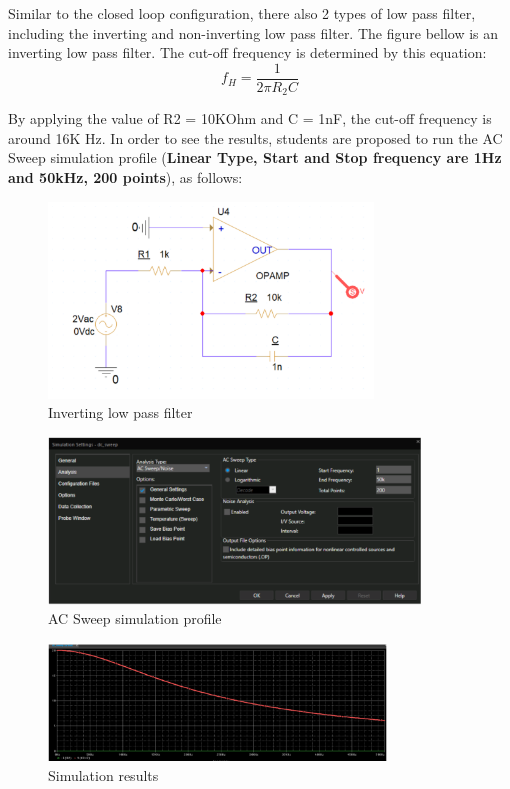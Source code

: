 Similar to the closed loop configuration, there also 2 types of low pass filter, including the
inverting and non-inverting low pass filter. The figure bellow is an inverting low pass filter.
The cut-off frequency is determined by this equation:
\[f_H = \dfrac{1}{2\pi R_2 C}\]

By applying the value of R2 = 10KOhm and C = 1nF, the cut-off frequency is around
16K Hz. In order to see the results, students are proposed to run the AC Sweep simulation profile (\textbf{Linear Type, Start and Stop frequency are 1Hz and 50kHz, 200 points}), as
follows:

\pagebreak
\begin{figure}[ht]
    \centering
    \includegraphics[width=0.77\textwidth]{graphics/ex1/f15.png}
    \caption{Inverting low pass filter}
\end{figure}

\begin{figure}[ht]
    \centering
    \includegraphics[width=0.88\textwidth]{graphics/ex1/f16.png}
    \caption{AC Sweep simulation profile}
\end{figure}

\begin{figure}[ht]
    \centering
    \includegraphics[width=0.8\textwidth]{graphics/ex1/f17.png}
    \caption{Simulation results}
\end{figure}

